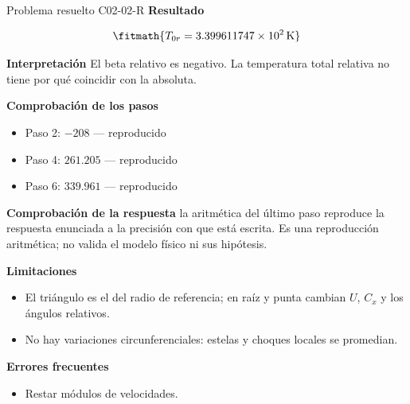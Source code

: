 \documentclass[10pt,openany]{book}
\begin{document}
\begin{studiumworked}{Problema resuelto C02-02-R}
\noindent\textbf{Resultado}

\[
\fitmath{T_{0r}=3.399611747\times10^{2}\,\mathrm{K}}
\]

\noindent\textbf{Interpretación}
El beta relativo es negativo. La temperatura total relativa no tiene por qué coincidir con la absoluta.

\noindent\textbf{Comprobación de los pasos}
\begin{itemize}
\item Paso 2: $-208$ — reproducido
\item Paso 4: $261.205$ — reproducido
\item Paso 6: $339.961$ — reproducido
\end{itemize}

\noindent\textbf{Comprobación de la respuesta} la aritmética del último paso reproduce la respuesta enunciada a la precisión con que está escrita. Es una reproducción aritmética; no valida el modelo físico ni sus hipótesis.

\noindent\textbf{Limitaciones}
\begin{itemize}
\item El triángulo es el del radio de referencia; en raíz y punta cambian $U$, $C_x$ y los ángulos relativos.
\item No hay variaciones circunferenciales: estelas y choques locales se promedian.
\end{itemize}

\noindent\textbf{Errores frecuentes}
\begin{itemize}
\item Restar módulos de velocidades.
\end{itemize}
\end{studiumworked}
\end{document}
